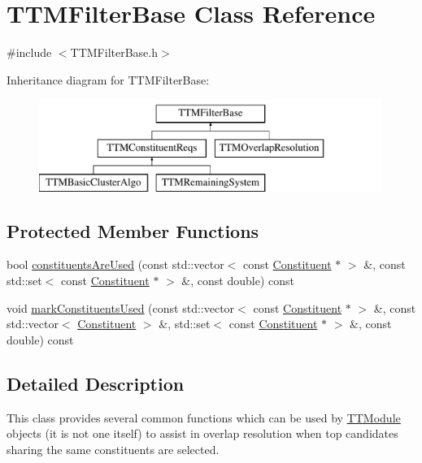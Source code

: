 \hypertarget{classTTMFilterBase}{\section{T\-T\-M\-Filter\-Base Class Reference}
\label{classTTMFilterBase}
}


{\ttfamily \#include $<$T\-T\-M\-Filter\-Base.\-h$>$}

Inheritance diagram for T\-T\-M\-Filter\-Base\-:\begin{figure}[H]
\begin{center}
\leavevmode
\includegraphics[height=3.000000cm]{classTTMFilterBase}
\end{center}
\end{figure}
\subsection*{Protected Member Functions}
\begin{DoxyCompactItemize}
\item 
bool \hyperlink{classTTMFilterBase_abfee8da5aa9015b18a408ba0883471f5}{constituents\-Are\-Used} (const std\-::vector$<$ const \hyperlink{classConstituent}{Constituent} $\ast$ $>$ \&, const std\-::set$<$ const \hyperlink{classConstituent}{Constituent} $\ast$ $>$ \&, const double) const 
\item 
void \hyperlink{classTTMFilterBase_a1dc5745da5777fc3bea18fe6fadcf365}{mark\-Constituents\-Used} (const std\-::vector$<$ const \hyperlink{classConstituent}{Constituent} $\ast$ $>$ \&, const std\-::vector$<$ \hyperlink{classConstituent}{Constituent} $>$ \&, std\-::set$<$ const \hyperlink{classConstituent}{Constituent} $\ast$ $>$ \&, const double) const 
\end{DoxyCompactItemize}


\subsection{Detailed Description}
This class provides several common functions which can be used by \hyperlink{classTTModule}{T\-T\-Module} objects (it is not one itself) to assist in overlap resolution when top candidates sharing the same constituents are selected. 

